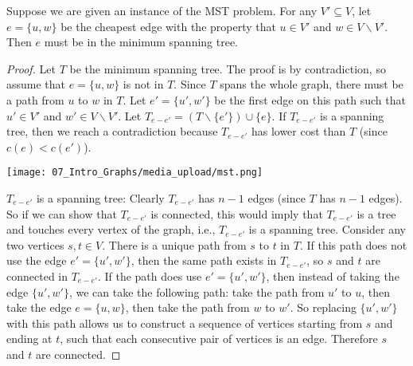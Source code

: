 \begin{flex}
\begin{theorem} \label{theorem:MST-cut-property} 
Suppose we are given an instance of the MST problem. For any $V' \subseteq V$, let $e = \{u,w\}$ be the cheapest edge with the property that $u \in V'$ and $w \in V\backslash V'$. Then $e$ must be in the minimum spanning tree.
\end{theorem}

\begin{proof}
Let $T$ be the minimum spanning tree. The proof is by contradiction, so assume that $e = \{u,w\}$ is not in $T$. Since $T$ spans the whole graph, there must be a path from $u$ to $w$ in $T$. Let $e' = \{u',w'\}$ be the first edge on this path such that $u' \in V'$ and $w' \in V \backslash V'$. Let $T_{e-e'} = (T \backslash \{e'\}) \cup \{e\}$. If $T_{e-e'}$ is a spanning tree, then we reach a contradiction because $T_{e-e'}$ has lower cost than $T$ (since $c(e) < c(e')$). 

\begin{center}
    \texttt{[image: 07\_Intro\_Graphs/media\_upload/mst.png]}
\end{center}

$T_{e-e'}$ is a spanning tree: Clearly $T_{e-e'}$ has $n-1$ edges (since $T$ has $n-1$ edges). So if we can show that $T_{e-e'}$ is connected, this would imply that $T_{e-e'}$ is a tree and touches every vertex of the graph, i.e., $T_{e-e'}$ is a spanning tree. Consider any two vertices $s,t \in V$. There is a unique path from $s$ to $t$ in $T$. If this path does not use the edge $e' = \{u',w'\}$, then the same path exists in $T_{e-e'}$, so $s$ and $t$ are connected in $T_{e-e'}$. If the path does use $e' = \{u',w'\}$, then instead of taking the edge $\{u',w'\}$, we can take the following path: take the path from $u'$ to $u$, then take the edge $e = \{u,w\}$, then take the path from $w$ to $w'$. So replacing $\{u',w'\}$ with this path allows us to construct a sequence of vertices starting from $s$ and ending at $t$, such that each consecutive pair of vertices is an edge. Therefore $s$ and $t$ are connected.
\end{proof}
\end{flex}



